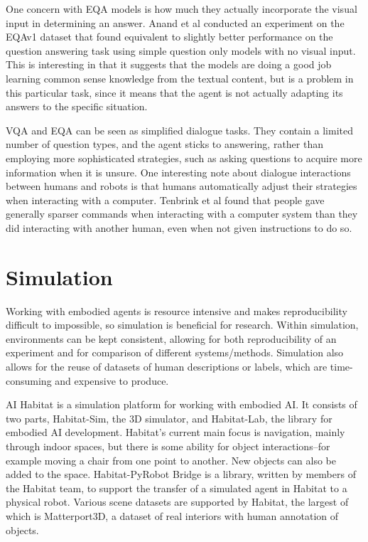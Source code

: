 One concern with EQA models is how much they actually incorporate the visual input in determining an answer. Anand et al conducted an experiment on the EQAv1 dataset that found equivalent to slightly better performance on the question answering task using simple question only models with no visual input\cite{blindfolded}. This is interesting in that it suggests that the models are doing a good job learning common sense knowledge from the textual content, but is a problem in this particular task, since it means that the agent is not actually adapting its answers to the specific situation. 

VQA and EQA can be seen as simplified dialogue tasks. They contain a limited number of question types, and the agent sticks to answering, rather than employing more sophisticated strategies, such as asking questions to acquire more information when it is unsure. One interesting note about dialogue interactions between humans and robots is that humans automatically adjust their strategies when interacting with a computer. %
Tenbrink et al found that people gave generally sparser commands when interacting with a computer system than they did interacting with another human, even when not given instructions to do so\cite{Tenbrink:2010qf}. 

\section{Simulation}
Working with embodied agents is resource intensive and makes reproducibility difficult to impossible, so simulation is beneficial for research. Within simulation, environments can be kept consistent, allowing for both reproducibility of an experiment and for comparison of different systems/methods. Simulation also allows for the reuse of datasets of human descriptions or labels, which are time-consuming and expensive to produce.

AI Habitat is a simulation platform for working with embodied AI\cite{habitat19iccv}. It consists of two parts, Habitat-Sim, the 3D simulator, and Habitat-Lab, the library for embodied AI development. Habitat's current main focus is navigation, mainly through indoor spaces, but there is some ability for object interactions--for example moving a chair from one point to another. New objects can also be added to the space. Habitat-PyRobot Bridge is a library, written by members of the Habitat team, to support the transfer of a simulated agent in Habitat to a physical robot\cite{Kadian_2020}. Various scene datasets are supported by Habitat, the largest of which is Matterport3D, a dataset of real interiors with human annotation of objects\cite{matterport}.

